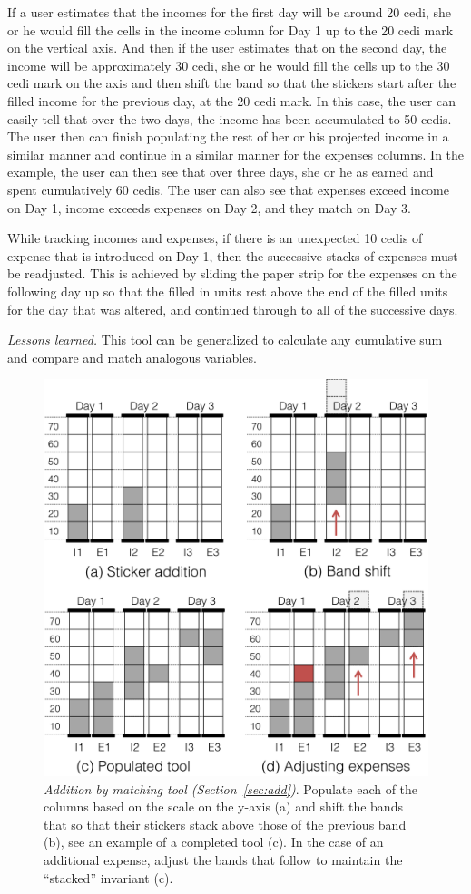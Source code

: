 \documentclass{sig-alternate}
\begin{document}
If a user estimates that the incomes for the first day will be around 20 cedi, she or he would fill the cells in the income column for Day 1 up to the 20 cedi mark on the vertical axis. And then if the user estimates that on the second day, the income will be approximately 30 cedi, she or he would fill the cells up to the 30 cedi mark on the axis and then shift the band so that the stickers start after the filled income for the previous day, at the 20 cedi mark. In this case, the user can easily tell that over the two days, the income has been accumulated to 50 cedis. The user then can finish populating the rest of her or his projected income in a similar manner and continue in a similar manner for the expenses columns. In the example, the user can then see that over three days, she or he as earned and spent cumulatively 60 cedis. The user can also see that expenses exceed income on Day 1, income exceeds expenses on Day 2, and they match on Day 3.

While tracking incomes and expenses, if there is an unexpected 10 cedis of expense that is introduced on Day 1, then the successive stacks of expenses must be readjusted. This is achieved by sliding the paper strip for the expenses on the following day up so that the filled in units rest above the end of the filled units for the day that was altered, and continued through to all of the successive days.

\emph{Lessons learned.} This tool can be generalized to calculate any cumulative sum and compare and match analogous variables.

\begin{figure}
\centering
\includegraphics[width=.9\linewidth]{img/add.png}
\caption{\emph{Addition by matching tool (Section~\ref{sec:add})}. Populate each of the columns based on the scale on the y-axis (a) and shift the bands that so that their stickers stack above those of the previous band (b), see an example of a completed tool (c). In the case of an additional expense, adjust the bands that follow to maintain the ``stacked'' invariant (c).}
\label{fig:add}
\end{figure}
\end{document}
